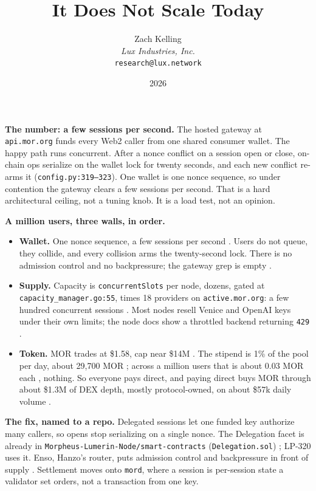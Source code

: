 \documentclass[11pt,a4paper]{article}
\title{It Does Not Scale Today}
\author{Zach Kelling\\\textit{Lux Industries, Inc.}\\\texttt{research@lux.network}}
\date{2026}
\newcommand{\code}[1]{\texttt{\small #1}}
\newcommand{\prov}[1]{{\color{muted}\scriptsize\sffamily[#1]}}
\begin{document}
\luxcoverpage
\sloppy

\par
\vspace{0.9ex}

\noindent\textbf{The number: a few sessions per second.} \prov{verified}
The hosted gateway at \code{api.mor.org} funds every Web2 caller from one shared consumer
wallet. The happy path runs concurrent. After a nonce conflict on a session open or close,
on-chain ops serialize on the wallet lock for twenty seconds, and each new conflict re-arms it
(\code{config.py:319--323}). One wallet is one nonce sequence, so under contention the gateway
clears a few sessions per second. That is a hard architectural ceiling, not a tuning knob. It is
a load test, not an opinion.

\vspace{0.4ex}
\noindent\textbf{A million users, three walls, in order.}
\begin{itemize}
\item \textbf{Wallet.} One nonce sequence, a few sessions per second \prov{verified}. Users do
      not queue, they collide, and every collision arms the twenty-second lock. There is no
      admission control and no backpressure; the gateway grep is empty \prov{verified}.
\item \textbf{Supply.} Capacity is \code{concurrentSlots} per node, dozens, gated at
      \code{capacity\_manager.go:55}, times 18 providers on \code{active.mor.org}: a few hundred
      concurrent sessions \prov{verified}. Most nodes resell Venice and OpenAI keys under their
      own limits; the node docs show a throttled backend returning \code{429} \prov{verified}.
\item \textbf{Token.} MOR trades at \$1.58, cap near \$14M \prov{verified}. The stipend is 1\% of
      the pool per day, about 29{,}700 MOR \prov{derived}; across a million users that is about
      0.03 MOR each \prov{illustrative}, nothing. So everyone pays direct, and paying direct buys
      MOR through about \$1.3M of DEX depth, mostly protocol-owned, on about \$57k daily volume
      \prov{verified}.
\end{itemize}

\vspace{0.2ex}
\noindent\textbf{The fix, named to a repo.}
Delegated sessions let one funded key authorize many callers, so opens stop serializing on a
single nonce. The Delegation facet is already in \code{Morpheus-Lumerin-Node/smart-contracts}
(\code{Delegation.sol}) \prov{verified}; LP-320 uses it. Enso, Hanzo's router, puts admission
control and backpressure in front of supply \prov{verified}. Settlement moves onto \code{mord},
where a session is per-session state a validator set orders, not a transaction from one key.
\end{document}
